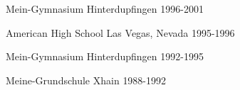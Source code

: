 \documentclass[11pt, a4paper]{awesome-cv} %
\begin{document}
\makecvheader %





\begin{cvhonors}
	
	
	\cvhonor
	{Mein-Gymnasium} %
	{} %
	{Hinterdupfingen} %
	{1996-2001} %
	
	
	\cvhonor
	{American High School} %
	{} %
	{Las Vegas, Nevada} %
	{1995-1996} %
	
	
	\cvhonor
	{Mein-Gymnasium} %
	{} %
	{Hinterdupfingen} %
	{1992-1995} %
	
	
	\cvhonor
	{Meine-Grundschule} %
	{} %
	{Xhain} %
	{1988-1992} %
	
	
\end{cvhonors}

\end{document}

